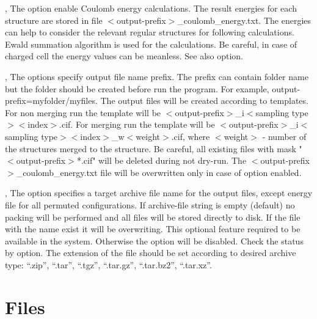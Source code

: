 \documentclass[a4paper,english]{article}
\begin{document}
\begin{Description}
\item[\Opt{-q}, \Opt{\Dd coulomb-energy}] 
      The option enable Coulomb energy calculations. The result energies for each structure are stored in file $<$output-prefix$>$\_coulomb\_energy.txt. The energies can help to consider the relevant regular structures for following calculations. Ewald summation algorithm is used for the calculations. Be careful, in case of charged cell the energy values can be meanless. See also  option.
      
\item[\OptArg{-o }{output-prefix}, \OptArg{\Dd output-prefix=}{output-prefix}]
      The options specify output file name prefix. The prefix can contain folder name but the folder should be created before run the program. For example, \Dd output-prefix=myfolder/myfiles. The output files will be created according to templates. For non merging run the template will be $<$output-prefix$>$\_i$<$sampling type$><$index$>$.cif. For merging run the template will be $<$output-prefix$>$\_i$<$sampling type$><$index$>$\_w$<$weight$>$.cif, where $<$weight$>$ - number of the structures merged to the structure. Be careful, all existing files with mask "$<$output-prefix$>$*.cif" will be deleted during not dry-run. The $<$output-prefix$>$\_coulomb\_energy.txt file will be overwritten only in case of  option enabled.
      
\item[\OptArg{-a }{archive-file}, \OptArg{\Dd archive=}{archive-file}]
      The option specifies a target archive file name for the output files, except energy file for all permuted configurations. If archive-file string is empty (default) no packing will be performed and all files will be stored directly to disk. If the file with the name exist it will be overwriting. This optional feature required   to be available in the system. Otherwise the option will be disabled. Check the status by  option. The extension of the file should be set according to desired archive type: ``.zip'', ``.tar'', ``.tgz'', ``.tar.gz'', ``.tar.bz2'', ``.tar.xz''.

\end{Description}

\section{Files}

\end{document}
